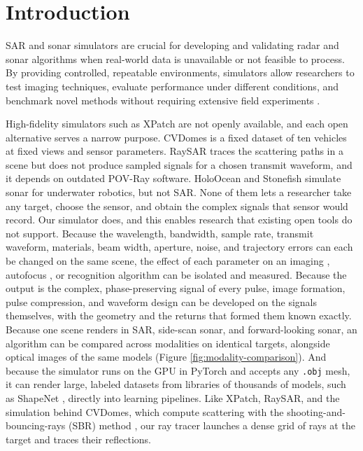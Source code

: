\documentclass[sensors,article,submit,moreauthors]{Definitions/mdpi}
\begin{document}
\section{Introduction}
\label{sec:intro}

SAR and sonar simulators are crucial for developing and validating radar and
sonar algorithms when real-world data is unavailable or not feasible to process.
By providing controlled, repeatable environments, simulators allow researchers
to test imaging techniques, evaluate performance under different conditions, and
benchmark novel methods without requiring extensive field experiments
\cite{sample,drozdowicz2021open,cerqueira2017sonar}.

High-fidelity simulators such as XPatch \cite{xpatch4} are not openly
available, and each open alternative serves a narrow purpose. CVDomes
\cite{cvdomes} is a fixed dataset of ten vehicles at fixed views and sensor
parameters. RaySAR \cite{raysar} traces the scattering paths in a scene but does
not produce sampled signals for a chosen transmit waveform, and it depends on
outdated POV-Ray software. HoloOcean \cite{holoocean_sonar_2022} and
Stonefish \cite{stonefish_2019} simulate sonar for underwater robotics, but not
SAR. None of them lets a researcher take any target, choose the sensor, and
obtain the complex signals that sensor would record. Our simulator does, and
this enables research that existing open tools do not support. Because the
wavelength, bandwidth, sample rate, transmit waveform, materials, beam width,
aperture, noise, and trajectory errors can each be changed on the same scene,
the effect of each parameter on an imaging \cite{spotlightmodesar}, autofocus
\cite{wahl1994pga}, or recognition \cite{chen2016target} algorithm can be
isolated and measured. Because the output is the complex,
phase-preserving signal of every pulse, image formation, pulse compression, and
waveform design \cite{levanon2004radar} can be developed on the signals themselves, with the geometry
and the returns that formed them known exactly. Because one scene renders in
SAR, side-scan sonar, and forward-looking sonar, an algorithm can be compared
across modalities on identical targets, alongside optical images of the same
models (Figure \ref{fig:modality-comparison}). And because the simulator runs on
the GPU in PyTorch \cite{pytorch} and accepts any \texttt{.obj} mesh, it can render large,
labeled datasets from libraries of thousands of models, such as ShapeNet
\cite{shapenet}, directly into learning pipelines. Like XPatch, RaySAR, and the
simulation behind CVDomes, which compute scattering with the
shooting-and-bouncing-rays (SBR) method \cite{sbr}, our ray tracer launches a
dense grid of rays at the target and traces their reflections.
\end{document}
